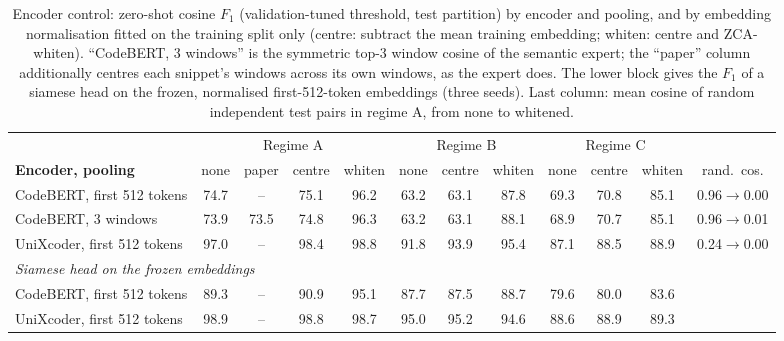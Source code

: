 \begin{table}[t]
\centering
\caption{Encoder control: zero-shot cosine $F_1$ (validation-tuned threshold, test partition) by encoder and pooling, and by embedding normalisation fitted on the training split only (centre: subtract the mean training embedding; whiten: centre and ZCA-whiten). ``CodeBERT, 3 windows'' is the symmetric top-3 window cosine of the semantic expert; the ``paper'' column additionally centres each snippet's windows across its own windows, as the expert does. The lower block gives the $F_1$ of a siamese head on the frozen, normalised first-512-token embeddings (three seeds). Last column: mean cosine of random independent test pairs in regime A, from none to whitened.}
\label{tab:encoder-control}
\footnotesize
\setlength{\tabcolsep}{3pt}
\begin{tabular}{l|cccc|ccc|ccc|c}
\toprule
 & \multicolumn{4}{c|}{Regime A} & \multicolumn{3}{c|}{Regime B} & \multicolumn{3}{c|}{Regime C} & \\
\textbf{Encoder, pooling} & none & paper & centre & whiten & none & centre & whiten & none & centre & whiten & rand.\ cos. \\
\midrule
CodeBERT, first 512 tokens & 74.7 & -- & 75.1 & 96.2 & 63.2 & 63.1 & 87.8 & 69.3 & 70.8 & 85.1 & 0.96$\to$0.00 \\
CodeBERT, 3 windows & 73.9 & 73.5 & 74.8 & 96.3 & 63.2 & 63.1 & 88.1 & 68.9 & 70.7 & 85.1 & 0.96$\to$0.01 \\
UniXcoder, first 512 tokens & 97.0 & -- & 98.4 & 98.8 & 91.8 & 93.9 & 95.4 & 87.1 & 88.5 & 88.9 & 0.24$\to$0.00 \\
\midrule
\multicolumn{12}{l}{\emph{Siamese head on the frozen embeddings}} \\
CodeBERT, first 512 tokens & 89.3 & -- & 90.9 & 95.1 & 87.7 & 87.5 & 88.7 & 79.6 & 80.0 & 83.6 &  \\
UniXcoder, first 512 tokens & 98.9 & -- & 98.8 & 98.7 & 95.0 & 95.2 & 94.6 & 88.6 & 88.9 & 89.3 &  \\
\bottomrule
\end{tabular}
\end{table}